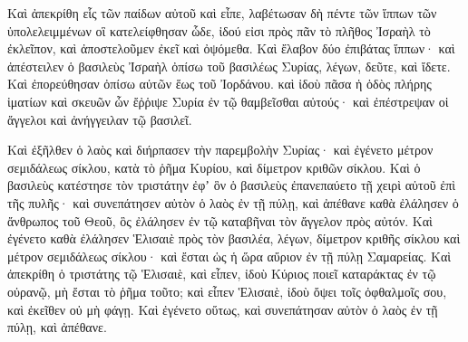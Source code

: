 {Καὶ ἀπεκρίθη εἷς τῶν παίδων αὐτοῦ καὶ εἶπε, λαβέτωσαν δὴ πέντε τῶν ἵππων τῶν ὑπολελειμμένων οἳ κατελείφθησαν ὧδε, ἰδού εἰσι πρὸς πᾶν τὸ πλῆθος Ἰσραὴλ τὸ ἐκλεῖπον, καὶ ἀποστελοῦμεν ἐκεῖ καὶ ὀψόμεθα.
Καὶ ἔλαβον δύο ἐπιβάτας ἵππων· καὶ ἀπέστειλεν ὁ βασιλεὺς Ἰσραὴλ ὀπίσω τοῦ βασιλέως Συρίας, λέγων, δεῦτε, καὶ ἴδετε.
Καὶ ἐπορεύθησαν ὀπίσω αὐτῶν ἕως τοῦ Ἰορδάνου. καὶ ἰδοὺ πᾶσα ἡ ὁδὸς πλήρης ἱματίων καὶ σκευῶν ὧν ἔῤῥιψε Συρία ἐν τῷ θαμβεῖσθαι αὐτούς· καὶ ἐπέστρεψαν οἱ ἄγγελοι καὶ ἀνήγγειλαν τῷ βασιλεῖ.
\par }{\PP {}Καὶ ἐξῆλθεν ὁ λαὸς καὶ διήρπασεν τὴν παρεμβολὴν Συρίας· καὶ ἐγένετο μέτρον σεμιδάλεως σίκλου, κατὰ τὸ ῥῆμα Κυρίου, καὶ δίμετρον κριθῶν σίκλου.
Καὶ ὁ βασιλεὺς κατέστησε τὸν τριστάτην ἐφʼ ὃν ὁ βασιλεὺς ἐπανεπαύετο τῇ χειρὶ αὐτοῦ ἐπὶ τῆς πυλῆς· καὶ συνεπάτησεν αὐτὸν ὁ λαὸς ἐν τῇ πύλῃ, καὶ ἀπέθανε καθὰ ἐλάλησεν ὁ ἄνθρωπος τοῦ Θεοῦ, ὃς ἐλάλησεν ἐν τῷ καταβῆναι τὸν ἄγγελον πρὸς αὐτόν.
Καὶ ἐγένετο καθὰ ἐλάλησεν Ἑλισαιὲ πρὸς τὸν βασιλέα, λέγων, δίμετρον κριθῆς σίκλου καὶ μέτρον σεμιδάλεως σίκλου· καὶ ἔσται ὡς ἡ ὥρα αὔριον ἐν τῇ πύλῃ Σαμαρείας.
Καὶ ἀπεκρίθη ὁ τριστάτης τῷ Ἑλισαιὲ, καὶ εἶπεν, ἰδοὺ Κύριος ποιεῖ καταράκτας ἐν τῷ οὐρανῷ, μὴ ἔσται τὸ ῥῆμα τοῦτο; καὶ εἶπεν Ἑλισαιὲ, ἰδοὺ ὄψει τοῖς ὀφθαλμοῖς σου, καὶ ἐκεῖθεν οὐ μὴ φάγῃ.
Καὶ ἐγένετο οὕτως, καὶ συνεπάτησαν αὐτὸν ὁ λαὸς ἐν τῇ πύλῃ, καὶ ἀπέθανε.

}
